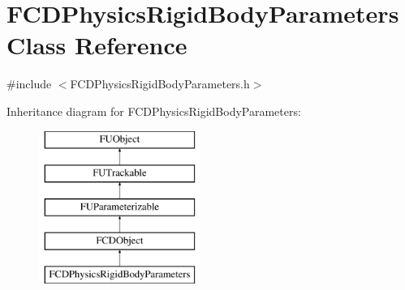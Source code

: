 \hypertarget{classFCDPhysicsRigidBodyParameters}{
\section{FCDPhysicsRigidBodyParameters Class Reference}
\label{classFCDPhysicsRigidBodyParameters}
}


{\ttfamily \#include $<$FCDPhysicsRigidBodyParameters.h$>$}

Inheritance diagram for FCDPhysicsRigidBodyParameters:\begin{figure}[H]
\begin{center}
\leavevmode
\includegraphics[height=5.000000cm]{classFCDPhysicsRigidBodyParameters}
\end{center}
\end{figure}
